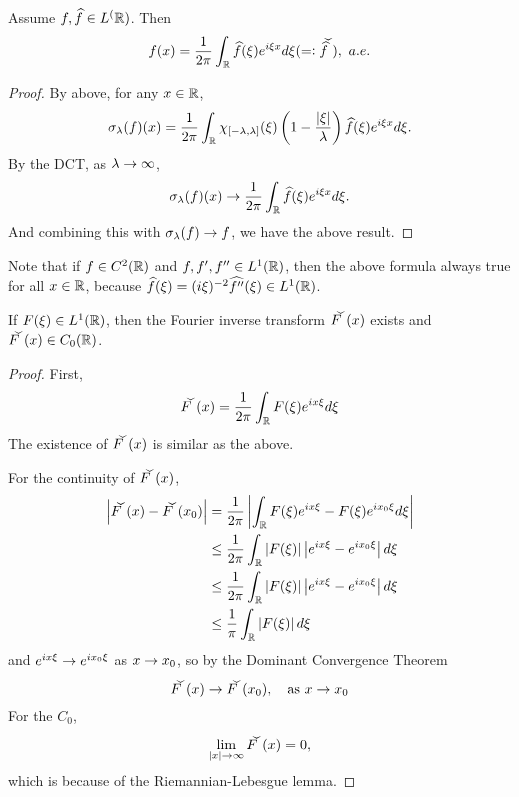 \begin{enumerate}[label=\arabic*.]
	\begin{cor}
		Assume $f,\widehat{f} \in L^(\mathbb{R})$. Then
		\begin{equation*}
			f(x) = \frac{1}{2\pi} \int_\R \widehat{f}(\xi)e^{i\xi x}d\xi (\eqdef \widecheck{\widehat{f}}),~a.e.
		\end{equation*}
	\end{cor}
	\begin{proof}
		By above, for any $x \in \mathbb{R}$,
		\begin{equation*}
			\sigma_\lambda(f)(x)=\frac{1}{2 \pi} \int_{\mathbb{R}} \chi_{[-\lambda, \lambda]}(\xi)\left(1-\frac{|\xi|}{\lambda}\right) \widehat{f}(\xi) e^{i \xi x} d \xi .
		\end{equation*}
		By the DCT, as $\lambda \rightarrow \infty$,
		\begin{equation*}
			\sigma_\lambda(f)(x) \rightarrow \frac{1}{2 \pi} \int_{\mathbb{R}} \widehat{f}(\xi) e^{i \xi x} d \xi .
		\end{equation*}
		And combining this with $\sigma_\lambda(f) \rightarrow f$, we have the above result.
	\end{proof}
	Note that if $f \in C^2(\mathbb{R})$ and $f,f^\prime,f^{\prime\prime} \in L^1(\mathbb{R})$, then the above formula always true for all $x \in \mathbb{R}$, because $\widehat{f}(\xi)=(i \xi)^{-2}\widehat{f^{\prime \prime}}(\xi) \in L^1(\mathbb{R})$.

	\begin{prop}
		If $F(\xi) \in L^1(\mathbb{R})$, then the Fourier inverse transform $\widecheck{F}(x)$ exists and $\widecheck{F}(x) \in C_0(\R)$.
	\end{prop}
	\begin{proof}
		First,
		\begin{equation*}
			\widecheck{F}(x) = \frac{1}{2\pi} \int_\R F(\xi)e^{ix\xi} d\xi
		\end{equation*}
		The existence of $\widecheck{F}(x)$ is similar as the above.

		\noindent For the continuity of $\widecheck{F}(x)$,
		\begin{equation*}
			\begin{aligned}
				\abs{\widecheck{F}(x)-\widecheck{F}(x_0)} &= \frac{1}{2\pi} \abs{\int_\R F(\xi)e^{ix\xi} - F(\xi)e^{ix_0\xi} d\xi} \\
				&\leq \frac{1}{2\pi} \int_\R \abs{F(\xi)}\abs{e^{ix\xi} -e^{ix_0\xi}} d\xi \\
				&\leq \frac{1}{2\pi} \int_\R \abs{F(\xi)}\abs{e^{ix\xi} -e^{ix_0\xi}} d\xi \\
				&\leq \frac{1}{\pi} \int_\R \abs{F(\xi)} d\xi
			\end{aligned}
		\end{equation*}
		and $e^{ix\xi} \rightarrow e^{ix_0\xi}$ as $x \rightarrow x_0$, so by the Dominant Convergence Theorem
		\begin{equation*}
			\widecheck{F}(x) \sto \widecheck{F}(x_0),\quad \text{as } x \sto x_0
		\end{equation*}
		For the $C_0$, 
		\begin{equation*}
			\lim_{\abs{x} \sto \infty}\widecheck{F}(x) = 0,
		\end{equation*}
		which is because of the Riemannian-Lebesgue lemma.
	\end{proof}


\end{enumerate}
